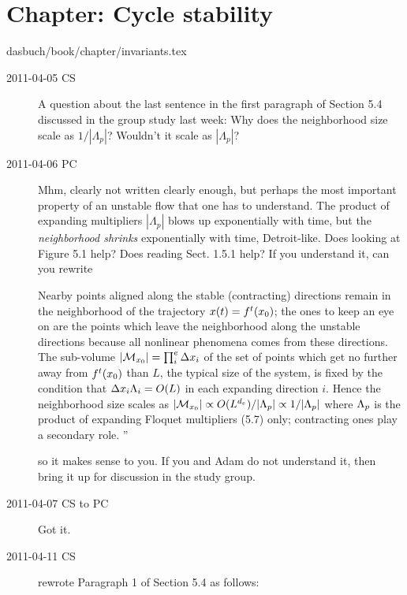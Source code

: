 \section{Chapter: Cycle stability}\noindent dasbuch/book/chapter/invariants.tex
\begin{description}

\item[2011-04-05 CS]
    A question about the last sentence in the first paragraph of Section
    5.4  discussed in the group study last week: Why does the
    neighborhood size scale as $1/|\Lambda_{p}|$? Wouldn't it scale as
    $|\Lambda_{p}|$?

\item[2011-04-06 PC] Mhm, clearly not written clearly enough, but
perhaps the most important property of an unstable flow
that one has to understand. The product of expanding multipliers
$|\Lambda_{p}|$ blows up exponentially with time, but the
\emph{neighborhood shrinks} exponentially with time, Detroit-like.
 Does looking
at Figure 5.1 help? Does reading Sect. 1.5.1 help? If you understand it,
can you rewrite

                                                    \toCB
Nearby points aligned along the stable
(contracting) directions  remain in the neighborhood of the
trajectory $x(t)= {f^{t}({x_0})}$; the ones to keep an eye
on are the points which leave the neighborhood along the
unstable directions because all nonlinear phenomena comes
from these directions. The sub-volume $ |{\cal M}_{{x_0}}| = \prod_i^e\Delta
x_i$ of the set of points which get no further away from
${f^{t}({x_0})}$ than $L$, the typical size of the system, is
fixed by the condition that $\Delta x_i \Lambda_i = O(L)$
in each expanding direction $i$. Hence the neighborhood size
scales as
$|{\cal M}_{{x_0}}| \propto O(L^{d_e})/|\Lambda_p| \propto 1/|\Lambda_p| $
where $\Lambda_p$ is the
product of expanding Floquet multipliers
(5.7) %
only;
contracting ones play a secondary role.
''

so it makes sense to you. If you and Adam do not understand it, then
bring it up for discussion in the study group.

\item[2011-04-07 CS to PC] Got it.

\item[2011-04-11 CS]
rewrote Paragraph 1 of Section 5.4 as follows:


\end{description}
